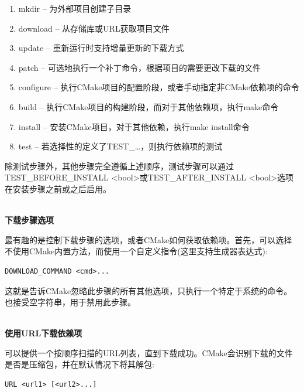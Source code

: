 \begin{enumerate}
\item 
mkdir – 为外部项目创建子目录

\item 
download – 从存储库或URL获取项目文件

\item 
update – 重新运行时支持增量更新的下载方式

\item 
patch – 可选地执行一个补丁命令，根据项目的需要更改下载的文件

\item 
configure – 执行CMake项目的配置阶段，或者手动指定非CMake依赖项的命令

\item 
build – 执行CMake项目的构建阶段，而对于其他依赖项，执行make命令

\item 
install – 安装CMake项目，对于其他依赖，执行make install命令

\item 
test – 若选择性的定义了TEST\_…，则执行依赖项的测试
\end{enumerate}

除测试步骤外，其他步骤完全遵循上述顺序，测试步骤可以通过TEST\_BEFORE\_INSTALL <bool>或TEST\_AFTER\_INSTALL <bool>选项在安装步骤之前或之后启用。

\hspace*{\fill} \\ %
\noindent
\textbf{下载步骤选项}

最有趣的是控制下载步骤的选项，或者CMake如何获取依赖项。首先，可以选择不使用CMake内置方法，而使用一个自定义指令(这里支持生成器表达式):

\begin{lstlisting}[style=styleCMake]
DOWNLOAD_COMMAND <cmd>...
\end{lstlisting} 

这就是告诉CMake忽略此步骤的所有其他选项，只执行一个特定于系统的命令。也接受空字符串，用于禁用此步骤。

\hspace*{\fill} \\ %
\noindent
\textbf{使用URL下载依赖项}

可以提供一个按顺序扫描的URL列表，直到下载成功。CMake会识别下载的文件是否是压缩包，并在默认情况下将其解包:

\begin{lstlisting}[style=styleCMake]
URL <url1> [<url2>...]
\end{lstlisting} 

